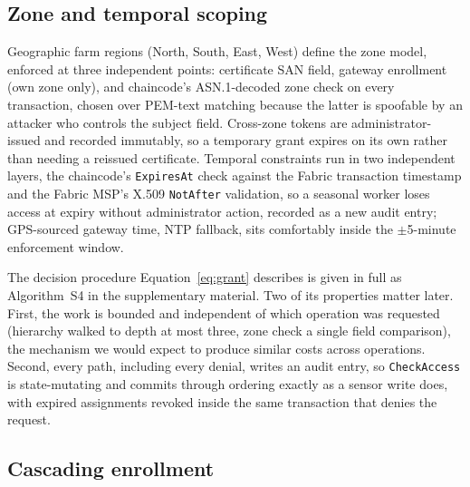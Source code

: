 \documentclass[a4paper,fleqn]{cas-sc}
\begin{document}
\subsection{Zone and temporal scoping}
\label{subsec:zones}

Geographic farm regions (North, South, East, West) define the zone model,
enforced at three independent points: certificate SAN field, gateway
enrollment (own zone only), and chaincode's ASN.1-decoded zone check on
every transaction, chosen over PEM-text matching because the latter is
spoofable by an attacker who controls the subject field. Cross-zone
tokens are administrator-issued and recorded immutably, so a temporary
grant expires on its own rather than needing a reissued certificate.
Temporal constraints run in two independent layers, the chaincode's
\texttt{ExpiresAt} check against the Fabric transaction timestamp and the
Fabric MSP's X.509 \texttt{NotAfter} validation, so a seasonal worker
loses access at expiry without administrator action, recorded as a new
audit entry; GPS-sourced gateway time, NTP fallback, sits comfortably
inside the $\pm$5-minute enforcement window.

The decision procedure Equation~\eqref{eq:grant} describes is given in
full as Algorithm~S4 in the supplementary material. Two of its properties
matter later. First, the work is bounded and independent of which
operation was requested (hierarchy walked to depth at most three, zone
check a single field comparison), the mechanism we would expect to produce
similar costs across operations. Second, every path, including every
denial, writes an audit entry, so \texttt{CheckAccess} is state-mutating
and commits through ordering exactly as a sensor write does, with expired
assignments revoked inside the same transaction that denies the request.

\subsection{Cascading enrollment}
\label{subsec:enrollment}
\end{document}
